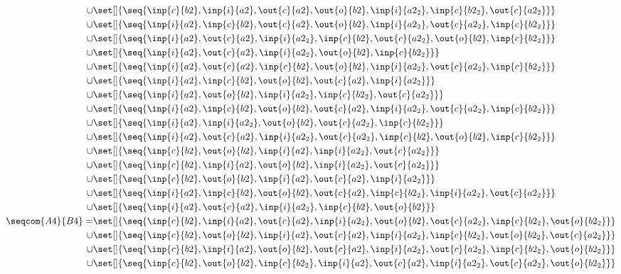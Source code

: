\begin{align*}
\cup&\set[]{\seq{\inp{c}{b2},\inp{i}{a2},\out{c}{a2},\out{o}{b2},\inp{i}{a2_2},\inp{c}{b2_2},\out{c}{a2_2}}}\\
\cup&\set[]{\seq{\inp{i}{a2},\inp{c}{b2},\out{c}{a2},\out{o}{b2},\inp{i}{a2_2},\out{c}{a2_2},\inp{c}{b2_2}}}\\
\cup&\set[]{\seq{\inp{i}{a2},\out{c}{a2},\inp{i}{a2_2},\inp{c}{b2},\out{c}{a2_2},\out{o}{b2},\inp{c}{b2_2}}}\\
\cup&\set[]{\seq{\inp{i}{a2},\out{c}{a2},\inp{i}{a2_2},\out{o}{b2},\inp{c}{b2_2}}}\\
\cup&\set[]{\seq{\inp{i}{a2},\out{c}{a2},\inp{c}{b2},\out{o}{b2},\inp{i}{a2_2},\out{c}{a2_2},\inp{c}{b2_2}}}\\
\cup&\set[]{\seq{\inp{i}{a2},\inp{c}{b2},\out{o}{b2},\out{c}{a2},\inp{i}{a2_2}}}\\
\cup&\set[]{\seq{\inp{i}{a2},\out{o}{b2},\inp{i}{a2_2},\inp{c}{b2_2},\out{c}{a2_2}}}\\
\cup&\set[]{\seq{\inp{i}{a2},\inp{c}{b2},\out{o}{b2},\out{c}{a2},\inp{i}{a2_2},\out{c}{a2_2},\inp{c}{b2_2}}}\\
\cup&\set[]{\seq{\inp{i}{a2},\inp{i}{a2_2},\out{o}{b2},\out{c}{a2_2},\inp{c}{b2_2}}}\\
\cup&\set[]{\seq{\inp{i}{a2},\out{c}{a2},\inp{i}{a2_2},\out{c}{a2_2},\inp{c}{b2},\out{o}{b2},\inp{c}{b2_2}}}\\
\cup&\set[]{\seq{\inp{c}{b2},\out{o}{b2},\inp{i}{a2},\inp{i}{a2_2},\out{c}{a2_2}}}\\
\cup&\set[]{\seq{\inp{c}{b2},\inp{i}{a2},\out{o}{b2},\inp{i}{a2_2},\out{c}{a2_2}}}\\
\cup&\set[]{\seq{\inp{c}{b2},\out{o}{b2},\inp{i}{a2},\out{c}{a2},\inp{i}{a2_2}}}\\
\cup&\set[]{\seq{\inp{i}{a2},\inp{c}{b2},\out{o}{b2},\out{c}{a2},\inp{c}{b2_2},\inp{i}{a2_2},\out{c}{a2_2}}}\\
\cup&\set[]{\seq{\inp{i}{a2},\out{c}{a2},\inp{i}{a2_2},\inp{c}{b2},\out{o}{b2}}}\\
%
\seqcom{A4}{B4} = &\set[]{\seq{\inp{c}{b2},\inp{i}{a2},\out{c}{a2},\inp{i}{a2_2},\out{o}{b2},\out{c}{a2_2},\inp{c}{b2_2},\out{o}{b2_2}}}\\
\cup&\set[]{\seq{\inp{c}{b2},\out{o}{b2},\inp{i}{a2},\out{c}{a2},\inp{i}{a2_2},\inp{c}{b2_2},\out{o}{b2_2},\out{c}{a2_2}}}\\
\cup&\set[]{\seq{\inp{c}{b2},\inp{i}{a2},\out{o}{b2},\out{c}{a2},\inp{i}{a2_2},\out{c}{a2_2},\inp{c}{b2_2},\out{o}{b2_2}}}\\
\cup&\set[]{\seq{\inp{c}{b2},\out{o}{b2},\inp{c}{b2_2},\inp{i}{a2},\out{c}{a2},\inp{i}{a2_2},\out{c}{a2_2},\out{o}{b2_2}}}\\

\end{align*}
